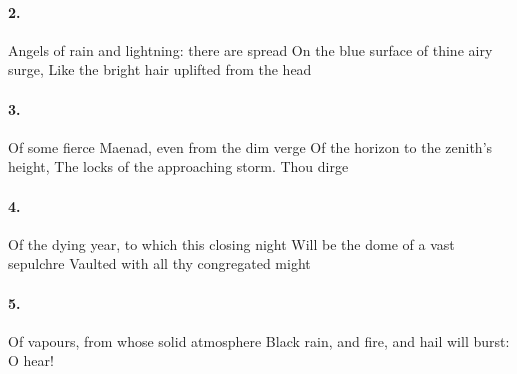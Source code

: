 \documentclass{article}
\begin{document}
			\paragraph{2.}
				Angels of rain and lightning: there are spread
				On the blue surface of thine airy surge,
				Like the bright hair uplifted from the head
			\paragraph{3.}
				Of some fierce Maenad, even from the dim verge
				Of the horizon to the zenith’s height,
				The locks of the approaching storm. Thou dirge
			\paragraph{4.}
				Of the dying year, to which this closing night
				Will be the dome of a vast sepulchre
				Vaulted with all thy congregated might
			\paragraph{5.}
				Of vapours, from whose solid atmosphere
				Black rain, and fire, and hail will burst: O hear!
\end{document}
